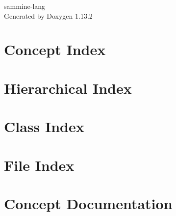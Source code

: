 \documentclass[twoside]{book}
\newcommand{\+}{\discretionary{\mbox{\scriptsize$\hookleftarrow$}}{}{}}
\newcommand{\clearemptydoublepage}{%
    \newpage{\pagestyle{empty}\cleardoublepage}%
  }
\begin{document}
  \raggedbottom
    \hypersetup{pageanchor=false,
                bookmarksnumbered=true,
                pdfencoding=unicode
               }
  \begin{titlepage}
  \vspace*{7cm}
  \begin{center}%
  {\Large sammine-\/lang}\\
  \vspace*{1cm}
  {\large Generated by Doxygen 1.13.2}\\
  \end{center}
  \end{titlepage}
  \clearemptydoublepage
  \tableofcontents
  \clearemptydoublepage
  \hypersetup{pageanchor=true}



\chapter{Concept Index}

\chapter{Hierarchical Index}

\chapter{Class Index}

\chapter{File Index}

\chapter{Concept Documentation}

\end{document}

